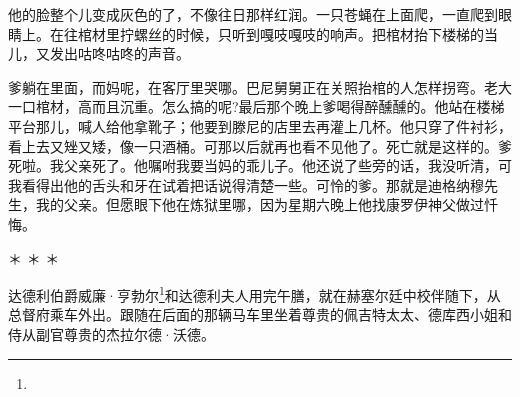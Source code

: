 \par 他的脸整个儿变成灰色的了，不像往日那样红润。一只苍蝇在上面爬，一直爬到眼睛上。在往棺材里拧螺丝的时候，只听到嘎吱嘎吱的响声。把棺材抬下楼梯的当儿，又发出咕咚咕咚的声音。
\par 爹躺在里面，而妈呢，在客厅里哭哪。巴尼舅舅正在关照抬棺的人怎样拐弯。老大一口棺材，高而且沉重。怎么搞的呢?最后那个晚上爹喝得醉醺醺的。他站在楼梯平台那儿，喊人给他拿靴子；他要到滕尼的店里去再灌上几杯。他只穿了件衬衫，看上去又矬又矮，像一只酒桶。可那以后就再也看不见他了。死亡就是这样的。爹死啦。我父亲死了。他嘱咐我要当妈的乖儿子。他还说了些旁的话，我没听清，可我看得出他的舌头和牙在试着把话说得清楚一些。可怜的爹。那就是迪格纳穆先生，我的父亲。但愿眼下他在炼狱里哪，因为星期六晚上他找康罗伊神父做过忏悔。
\par ＊ ＊ ＊
\par 达德利伯爵威廉·亨勃尔\footnote{}和达德利夫人用完午膳，就在赫塞尔廷中校伴随下，从总督府乘车外出。跟随在后面的那辆马车里坐着尊贵的佩吉特太太、德库西小姐和侍从副官尊贵的杰拉尔德·沃德。
